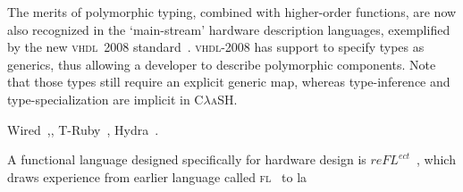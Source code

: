 \documentclass[conference,pdf,a4paper,10pt,final,twoside,twocolumn]{IEEEtran}
\def\VHDL{\textsc{vhdl}}
\def\CLaSH{\textsc{C$\lambda$aSH}}
\begin{document}
The merits of polymorphic typing, combined with higher-order functions, are now also recognized in the `main-stream' hardware description languages, exemplified by the new \VHDL\ 2008 standard~\cite{VHDL2008}. \VHDL-2008 has support to specify types as generics, thus allowing a developer to describe polymorphic components. Note that those types still require an explicit generic map, whereas type-inference and type-specialization are implicit in \CLaSH.

Wired~\cite{Wired},, T-Ruby~\cite{T-Ruby}, Hydra~\cite{Hydra}. 

A functional language designed specifically for hardware design is $re{\mathit{FL}}^{ect}$~\cite{reFLect}, which draws experience from earlier language called \textsc{fl}~\cite{FL} to la

%
%



%
%
\end{document}
